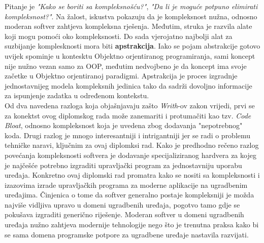 Pitanje je \textit{"Kako se boriti sa kompleksnošću?"}, \textit{"Da li je moguće potpuno elimirati kompleksnost?"}. Na žalost, iskustva pokazuju da je kompleksnost nužna, odnosno moderan softver zahtjeva kompleksna rješenja. Međutim, struka je razvila alate koji mogu pomoći oko kompleksnosti. Do sada vjerojatno najbolji alat za suzbijanje komplesknosti mora biti \textbf{apstrakcija}. Iako se pojam abstrakcije gotovo uvijek spominje u kontesktu Objektno orjentiranog programiranja, sami koncept nije nužno vezan samo za OOP, međutim nedvojbeno je da koncept ima svoje začetke u Objektno orjentiranoj paradigmi. Apstrakcija je proces izgradnje jednostavnijeg modela kompleksnih jedinica tako da sadrži dovoljno informacije za ispunjenje zadatka u određenom kontekstu. \\   

Od dva navedena razloga koja objašnjavaju zašto \textit{Writh}-ov zakon vrijedi, prvi se za konektst ovog diplomskog rada može zanemariti i protumačiti kao tzv. \textit{Code Bloat}, odnosno kompleksnost koja je uvedena zbog dodavanja "nepotrebnog" koda. Drugi razlog je mnogo interesantniji i intrigantniji jer se radi o problemu tehničke naravi, ključnim za ovaj diplomksi rad. Kako je predhodno rečeno razlog povećanja kompleksnosti softvera je dodavanje specijaliziranog hardvera za kojeg je najčešće potrebno izgraditi upravljački program za jednostavniju uporabu uređaja. Konkretno ovaj diplomski rad promatra kako se nositi sa kompleksnosti i izazovima izrade upravljačkih programa za moderne aplikacije na ugradbenim uređajima. Činjenica o tome da softver generalno postaje kompleksniji je možda najviše vidljiva upravo u domeni ugradbenih uređaja, pogotvo tamo gdje se pokušava izgraditi generično riješenje. Moderan softver u domeni ugradbenih uređaja nužno zahtjeva modernije tehnologije nego što je trenutna praksa kako bi se sama domena programske potpore za ugradbene uređaje nastavila razvijati.
\pagebreak

